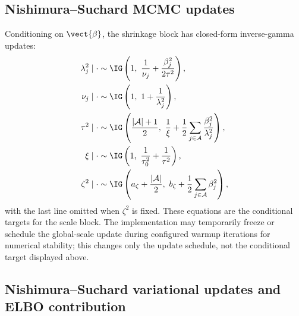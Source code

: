 \subsection{Nishimura--Suchard MCMC updates}

Conditioning on $\vect{\beta}$, the shrinkage block has closed-form
inverse-gamma updates:
\begin{align}
\lambda_j^2\mid\cdot
&\sim
\IG\left(1,\ \frac{1}{\nu_j}+\frac{\beta_j^2}{2\tau^2}\right),\\
\nu_j\mid\cdot
&\sim
\IG\left(1,\ 1+\frac{1}{\lambda_j^2}\right),\\
\tau^2\mid\cdot
&\sim
\IG\left(\frac{|\mathcal{A}|+1}{2},\
\frac{1}{\xi}+\frac{1}{2}\sum_{j\in\mathcal{A}}\frac{\beta_j^2}{\lambda_j^2}
\right),\\
\xi\mid\cdot
&\sim
\IG\left(1,\ \frac{1}{\tau_0^2}+\frac{1}{\tau^2}\right),\\
\zeta^2\mid\cdot
&\sim
\IG\left(a_\zeta+\frac{|\mathcal{A}|}{2},\
b_\zeta+\frac{1}{2}\sum_{j\in\mathcal{A}}\beta_j^2
\right),
\label{eq:rhs_ns_mcmc}
\end{align}
with the last line omitted when $\zeta^2$ is fixed.
These equations are the conditional targets for the  scale block. The
implementation may temporarily freeze or schedule the global-scale update during
configured warmup iterations for numerical stability; this changes only the
update schedule, not the conditional target displayed above.

\subsection{Nishimura--Suchard variational updates and ELBO contribution}

